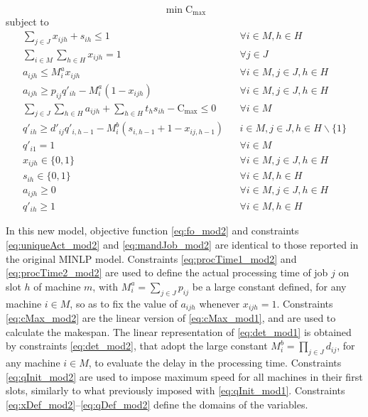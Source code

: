\documentclass[a4paper,11pt]{article}
\begin{document}
\begin{equation}\label{eq:fo_mod2}
	\min \text{C}_{\max}
\end{equation}
\qquad subject to
\begin{eqnarray}
\label{eq:uniqueAct_mod2} \sum_{j \in J}{x_{ijh}} +  s_{ih} \leq 1 && \forall i \in M, h \in H \\
\label{eq:mandJob_mod2} \sum_{i \in M}\sum_{h \in H}{x_{ijh}} = 1 && \forall j \in J\\
\label{eq:procTime1_mod2} a_{ijh} \leq M^a_i x_{ijh} && \forall i \in M, j \in J, h \in H\\
\label{eq:procTime2_mod2} a_{ijh} \geq p_{ij} q'_{ih} - M^a_i (1-x_{ijh}) &&\forall i \in M, j \in J, h \in H\\
\label{eq:cMax_mod2} \sum_{j \in J}\sum_{h \in H} a_{ijh} + \sum_{h \in H} t_h s_{ih} - \text{C}_{\max} \leq 0 && \forall i \in M\\
\label{eq:det_mod2} q'_{ih} \geq d'_{ij} q'_{i,h-1} - M^b_i(s_{i,h-1}+1-x_{ij,h-1}) && i \in M, j \in J,  h \in H\backslash\{1\}\\
\label{eq:qInit_mod2} q'_{i1} = 1 && \forall i \in M\\
\label{eq:xDef_mod2} x_{ijh} \in \{0,1\} && \forall i \in M,  j \in J, h \in H\\
\label{eq:dDef_mod2} s_{ih} \in \{0,1\} && \forall i \in M, h \in H\\
\label{eq:aDef_mod2} a_{ijh} \geq 0 && \forall i \in M, j \in J,  h \in H\\
\label{eq:qDef_mod2} q'_{ih} \geq 1 && \forall  i \in M, h \in H
\end{eqnarray}

In this new model, objective function \eqref{eq:fo_mod2} and constraints \eqref{eq:uniqueAct_mod2} and \eqref{eq:mandJob_mod2} are identical to those reported in the original MINLP model. Constraints \eqref{eq:procTime1_mod2} and \eqref{eq:procTime2_mod2} are used to define the actual processing time of job $j$ on slot $h$ of machine $m$, with $M^a_i = \sum_{j \in J}{p_{ij}}$ be a large constant defined, for any machine $i \in M$, so as to fix the value of $a_{ijh}$ whenever $x_{ijh}=1$. 
Constraints \eqref{eq:cMax_mod2} are the linear version of \eqref{eq:cMax_mod1}, and are used to calculate the makespan. 
The linear representation of \eqref{eq:det_mod1} is obtained by constraints \eqref{eq:det_mod2}, that adopt the large constant $M^b_i = \prod_{j \in J}{d_{ij}}$, for any machine $i \in M$, to evaluate the delay in the processing time. Constraints \eqref{eq:qInit_mod2} are used to impose maximum speed for all machines in their first slots, similarly to what previously imposed with \eqref{eq:qInit_mod1}. Constraints \eqref{eq:xDef_mod2}--\eqref{eq:qDef_mod2} define the domains of the variables.
\end{document}
